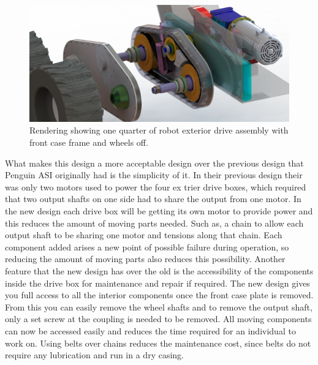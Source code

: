 \begin{figure}[htbp]
\includegraphics[width=\linewidth]{images/drive_box_presentation_rndr.jpg}
\caption[Quarter view of robot]{Rendering showing one quarter of robot exterior drive assembly with front case frame and wheels off. }
\label{fig:quart_assem}
\end{figure}

What makes this design a more acceptable design over the previous design that Penguin ASI originally had is the simplicity of it. In their previous design their was only two motors used to power the four ex trier drive boxes, which required that two output shafts on one side had to share the output from one motor. In the new design each drive box will be getting its own motor to provide power and this reduces the amount of moving parts needed. Such as, a chain to allow each output shaft to be sharing one motor and tensions along that chain. Each component added arises a new point of possible failure during operation, so reducing the amount of moving parts also reduces this possibility. Another feature that the new design has over the old is the accessibility of the components inside the drive box for maintenance and repair if required. The new design gives you full access to all the interior components once the front case plate is removed. From this you can easily remove the wheel shafts and to remove the output shaft, only a set screw at the coupling is needed to be removed. All moving components can now be accessed easily and reduces the time required for an individual to work on. Using belts over chains reduces the maintenance cost, since belts do not require any lubrication and run in a dry casing.


